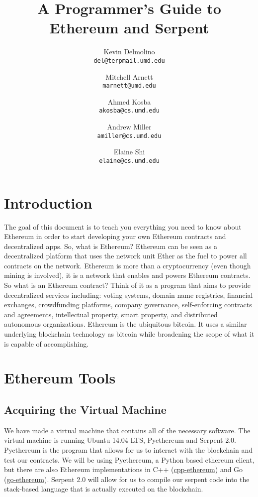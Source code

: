\documentclass[12pt]{article}
\begin{document}
\title{A Programmer's Guide to Ethereum and Serpent}

\author{
  Kevin Delmolino\\
  \texttt{del@terpmail.umd.edu}
  \and
  Mitchell Arnett\\
  \texttt{marnett@umd.edu}
  \and
  Ahmed Kosba\\
  \texttt{akosba@cs.umd.edu}
  \and
  Andrew Miller\\
  \texttt{amiller@cs.umd.edu}
  \and
  Elaine Shi\\
  \texttt{elaine@cs.umd.edu}
}

\maketitle

\setcounter{tocdepth}{5}
\tableofcontents

\section{Introduction}
The goal of this document is to teach you everything you need to know about Ethereum in order to start developing your own Ethereum contracts and decentralized apps. 
So, what is Ethereum? Ethereum can be seen as a decentralized platform that uses the network unit Ether as the fuel to power all contracts on the network. Ethereum is more than a cryptocurrency (even though mining is involved), it is a network that enables and powers Ethereum contracts. So what is an Ethereum contract? Think of it as a program that aims to provide decentralized services including: voting systems, domain name registries, financial exchanges, crowdfunding platforms, company governance, self-enforcing contracts and agreements, intellectual property, smart property, and distributed autonomous organizations. Ethereum is the ubiquitous bitcoin. It uses a similar underlying blockchain technology as bitcoin while broadening the scope of what it is capable of accomplishing. \cite{Shi2015,EthereumWhitePaper}

\section{Ethereum Tools}
\subsection{Acquiring the Virtual Machine}
We have made a virtual machine that contains all of the necessary software. The virtual machine is running Ubuntu 14.04 LTS, Pyethereum and Serpent 2.0. Pyethereum is the program that allows for us to interact with the blockchain and test our contracts. We will be using Pyethereum, a Python based ethereum client, but there are also Ethereum implementations in C++ (\href{https://github.com/ethereum/cpp-ethereum}{cpp-ethereum}) and Go (\href{https://github.com/ethereum/go-ethereum}{go-ethereum}). Serpent 2.0 will allow for us to compile our serpent code into the stack-based language that is actually executed on the blockchain. 
\end{document}
